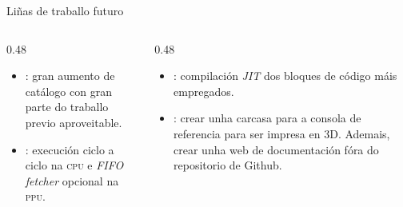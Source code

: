 \begin{frame}{Liñas de traballo futuro}
  \small
  \begin{columns}[t]
    \begin{column}{0.48\textwidth}
      \begin{itemize}
        \item {}: gran aumento de catálogo con gran parte do traballo previo aproveitable.
        
        \item {}: execución ciclo a ciclo na \textsc{cpu} e
        \textit{FIFO fetcher} opcional na \textsc{ppu}.

        
      \end{itemize}
    \end{column}
    \begin{column}{0.48\textwidth}
      \begin{itemize}
        \item {}: compilación \textit{JIT} dos bloques de código máis empregados.

        \item {}: crear unha carcasa para a consola de referencia
        para ser impresa en 3D. Ademais, crear unha web de documentación fóra do repositorio de Github.
      \end{itemize}
    \end{column}
  \end{columns}
\end{frame}
